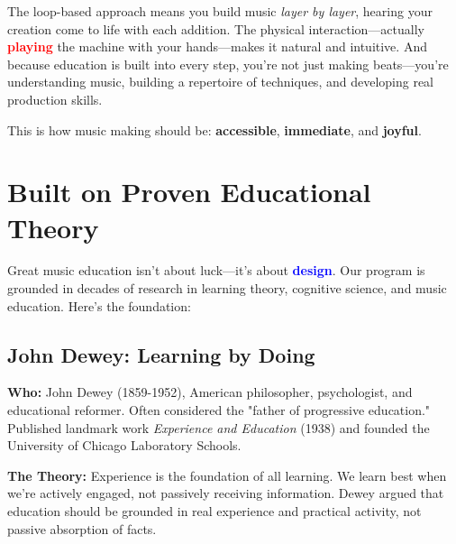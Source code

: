 \documentclass[11pt,letterpaper]{article}
\newcommand{\bluepurple}[1]{\textcolor{blue}{\textbf{#1}}}
\newcommand{\redtext}[1]{\textcolor{red}{\textbf{#1}}}
\begin{document}
The loop-based approach means you build music \textit{layer by layer}, hearing your creation come to life with each addition. The physical interaction—actually \redtext{playing} the machine with your hands—makes it natural and intuitive. And because education is built into every step, you're not just making beats—you're understanding music, building a repertoire of techniques, and developing real production skills.

This is how music making should be: \textbf{accessible}, \textbf{immediate}, and \textbf{joyful}.

\newpage

\section*{Built on Proven Educational Theory}

\begin{center}
\end{center}

\vspace{0.5cm}

Great music education isn't about luck—it's about \bluepurple{design}. Our program is grounded in decades of research in learning theory, cognitive science, and music education. Here's the foundation:

\subsection*{John Dewey: Learning by Doing}

\textbf{Who:} John Dewey (1859-1952), American philosopher, psychologist, and educational reformer. Often considered the "father of progressive education." Published landmark work \textit{Experience and Education} (1938) and founded the University of Chicago Laboratory Schools.

\textbf{The Theory:} Experience is the foundation of all learning. We learn best when we're actively engaged, not passively receiving information. Dewey argued that education should be grounded in real experience and practical activity, not passive absorption of facts.
\end{document}
